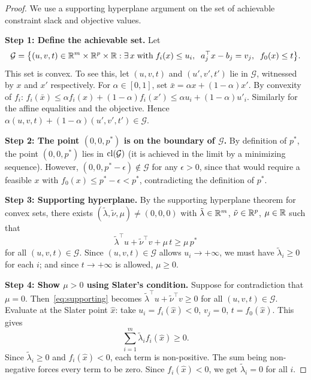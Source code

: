 \documentclass[11pt,a4paper]{article}
\begin{document}
\begin{proof}
We use a supporting hyperplane argument on the set of achievable constraint
slack and objective values.

\textbf{Step 1: Define the achievable set.}
Let
\begin{equation}\label{eq:set-G}
  \mathcal{G} = \bigl\{(u, v, t) \in \mathbb{R}^m \times \mathbb{R}^p \times \mathbb{R} :
    \exists\, x \;\text{with}\; f_i(x) \le u_i, \;\;
    a_j^\top x - b_j = v_j, \;\; f_0(x) \le t \bigr\}.
\end{equation}
This set is convex. To see this, let $(u, v, t)$ and $(u', v', t')$ lie in
$\mathcal{G}$, witnessed by $x$ and $x'$ respectively. For
$\alpha \in [0,1]$, set $\bar{x} = \alpha x + (1{-}\alpha) x'$. By
convexity of $f_i$:
$f_i(\bar{x}) \le \alpha f_i(x) + (1{-}\alpha) f_i(x') \le \alpha u_i
+ (1{-}\alpha) u'_i$. Similarly for the affine equalities and the
objective. Hence $\alpha(u,v,t) + (1{-}\alpha)(u',v',t') \in \mathcal{G}$.

\textbf{Step 2: The point $(0, 0, p^*)$ is on the boundary of $\mathcal{G}$.}
By definition of $p^*$, the point $(0, 0, p^*)$ lies in $\operatorname{cl}(\mathcal{G})$
(it is achieved in the limit by a minimizing sequence). However,
$(0, 0, p^* - \epsilon) \notin \mathcal{G}$ for any $\epsilon > 0$, since
that would require a feasible $x$ with $f_0(x) \le p^* - \epsilon < p^*$,
contradicting the definition of $p^*$.

\textbf{Step 3: Supporting hyperplane.}
By the supporting hyperplane theorem for convex sets, there exists
$(\tilde{\lambda}, \tilde{\nu}, \mu) \neq (0, 0, 0)$ with
$\tilde{\lambda} \in \mathbb{R}^m$, $\tilde{\nu} \in \mathbb{R}^p$, $\mu \in \mathbb{R}$ such that
\begin{equation}\label{eq:supporting}
  \tilde{\lambda}^\top u + \tilde{\nu}^\top v + \mu\, t
  \ge \mu\, p^*
\end{equation}
for all $(u, v, t) \in \mathcal{G}$. Since $(u, v, t) \in \mathcal{G}$
allows $u_i \to +\infty$, we must have $\tilde{\lambda}_i \ge 0$ for each
$i$; and since $t \to +\infty$ is allowed, $\mu \ge 0$.

\textbf{Step 4: Show $\mu > 0$ using Slater's condition.}
Suppose for contradiction that $\mu = 0$. Then~\eqref{eq:supporting} becomes
$\tilde{\lambda}^\top u + \tilde{\nu}^\top v \ge 0$ for all
$(u, v, t) \in \mathcal{G}$. Evaluate at the Slater point $\hat{x}$: take
$u_i = f_i(\hat{x}) < 0$, $v_j = 0$, $t = f_0(\hat{x})$. This gives
\[
  \sum_{i=1}^m \tilde{\lambda}_i f_i(\hat{x}) \ge 0.
\]
Since $\tilde{\lambda}_i \ge 0$ and $f_i(\hat{x}) < 0$, each term is
non-positive. The sum being non-negative forces every term to be zero.
Since $f_i(\hat{x}) < 0$, we get $\tilde{\lambda}_i = 0$ for all $i$.


\end{proof}
\end{document}

